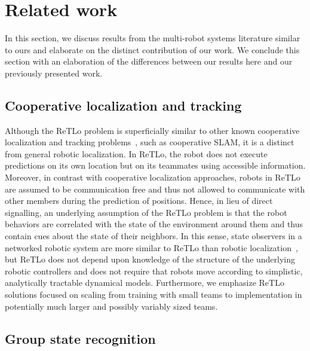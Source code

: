 \documentclass[letterpaper, 10 pt, conference]{ieeeconf}  %
\begin{document}
	\section{Related work}
	\label{sec:related_work}

    In this section, we discuss results from the multi-robot
    systems literature similar to ours and elaborate on the distinct
    contribution of our work. We conclude this section with an
    elaboration of the differences between our results here and our
    previously presented work.

    \subsection{Cooperative localization and tracking}

    Although the ReTLo problem is superficially similar to other known
    cooperative localization and tracking problems~\cite{GKD04, LSRB16,
    FSDO10, CX14, DMG15}, such as cooperative SLAM, it is a distinct
    from general robotic localization. In ReTLo, the robot does not
    execute predictions on its own location but on its teammates using
    accessible information. Moreover, in contrast with cooperative
    localization approaches, robots in ReTLo are assumed to be
    communication free and thus not allowed to communicate with other
    members during the prediction of positions. Hence, in lieu of direct
    signalling, an underlying assumption of the ReTLo problem is that the
    robot behaviors are correlated with the state of the environment
    around them and thus contain cues about the state of their
    neighbors. In this sense, state observers in a networked robotic
    system are more similar to ReTLo than robotic
    localization~\cite{XNX10, GACM12}, but ReTLo does not depend upon
    knowledge of the structure of the underlying robotic controllers and
    does not require that robots move according to simplistic,
    analytically tractable dynamical models. Furthermore, we emphasize
    ReTLo solutions focused on scaling from training with small teams to
    implementation in potentially much larger and possibly variably
    sized teams.

	\subsection{Group state recognition}
	\label{sec:group_state_recognition}
\end{document}
